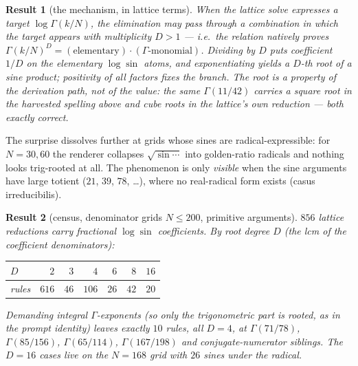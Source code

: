 \documentclass[11pt]{article}
\newtheorem{result}{Result}[section]
\theoremstyle{remark}
\begin{document}
\begin{result}[the mechanism, in lattice terms]\label{res:trigmech}
When the lattice solve expresses a target $\log\Gamma(k/N)$, the elimination may pass
through a combination in which the target appears with multiplicity $D>1$ --- i.e.\ the
relation natively proves $\Gamma(k/N)^D=(\text{elementary})\cdot(\Gamma\text{-monomial})$.
Dividing by $D$ puts coefficient $1/D$ on the elementary $\log\sin$ atoms, and
exponentiating yields a $D$-th root of a sine product; positivity of all factors fixes the
branch. The root is a property of the \emph{derivation path}, not of the value: the same
$\Gamma(11/42)$ carries a square root in the harvested spelling above and cube roots in
the lattice's own reduction --- both exactly correct.
\end{result}

The surprise dissolves further at grids whose sines are radical-expressible: for
$N=30,60$ the renderer collapses $\sqrt{\sin\cdots}$ into golden-ratio radicals and
nothing looks trig-rooted at all. The phenomenon is only \emph{visible} when the sine
arguments have large totient ($21$, $39$, $78$, \dots), where no real-radical form exists
(casus irreducibilis).

\begin{result}[census, denominator grids $N\le200$, primitive arguments]\label{res:census}
$856$ lattice reductions carry fractional $\log\sin$ coefficients. By root degree $D$
(the lcm of the coefficient denominators):
\begin{center}
\begin{tabular}{l rrrrrr}
\toprule
$D$ & $2$ & $3$ & $4$ & $6$ & $8$ & $16$\\
\midrule
rules & $616$ & $46$ & $106$ & $26$ & $42$ & $20$\\
\bottomrule
\end{tabular}
\end{center}
Demanding \emph{integral} $\Gamma$-exponents (so only the trigonometric part is rooted, as
in the prompt identity) leaves exactly $10$ rules, all $D=4$, at $\Gamma(71/78)$,
$\Gamma(85/156)$, $\Gamma(65/114)$, $\Gamma(167/198)$ and conjugate-numerator siblings.
The $D=16$ cases live on the $N=168$ grid with $26$ sines under the radical.
\end{result}
\end{document}
